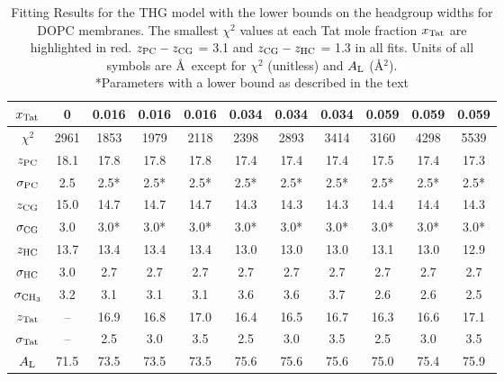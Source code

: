 \begin{table}[htbp]
  \centering
  \begin{tabular}{c|c|ccc|ccc|ccc}
  \hline 
    $x_\textrm{Tat}$ & 0  &    0.016 & 0.016 & 0.016 & 0.034 & 0.034 & 0.034 & 0.059 & 0.059 & 0.059 \\
    \hline
    $\chi^2$ & 2961 & {\color{red}1853} & 1979 & 2118 & {\color{red}2398} & 2893 & 3414    & {\color{red}3160} & 4298 & 5539 \\   
    $z_\textrm{PC}$ & 18.1   &    17.8 & 17.8 & 17.8 & 17.4 & 17.4 & 17.4    & 17.5 & 17.4 & 17.3 \\   
    $\sigma_\textrm{PC}$  & 2.5 &   2.5* &  2.5* &  2.5* & 2.5* & 2.5* & 2.5*       & 2.5* & 2.5* & 2.5* \\      
    $z_\textrm{CG}$   & 15.0 &    14.7 & 14.7 & 14.7 & 14.3 & 14.3 & 14.3    & 14.4 & 14.4 & 14.3 \\   
    $\sigma_\textrm{CG}$ & 3.0 &    3.0* &  3.0* &  3.0* & 3.0* & 3.0* & 3.0* & 3.0* & 3.0* & 3.0* \\      
    $z_\textrm{HC}$ & 13.7 &     13.4 & 13.4 & 13.4  & 13.0 & 13.0 & 13.0    & 13.1 & 13.0 & 12.9 \\   
    $\sigma_\textrm{HC}$ &      3.0 &2.7 & 2.7 & 2.7  & 2.7 & 2.7 & 2.7       & 2.7 & 2.7 & 2.7 \\      
    $\sigma_{\textrm{CH}_3}$ & 3.2 & 3.1 & 3.1 & 3.1 & 3.6 & 3.6 & 3.7       & 2.6 & 2.6 & 2.5 \\      
    $z_\textrm{Tat}$ & -- &          16.9 & 16.8 & 17.0 & 16.4 & 16.5 & 16.7    & 16.3 & 16.6 & 17.1 \\   
    $\sigma_\textrm{Tat}$ & -- &         2.5 & 3.0 & 3.5 & 2.5 & 3.0 & 3.5       & 2.5 & 3.0 & 3.5 \\      
    $A_\textrm{L}$ & 71.5 &       73.5 & 73.5 & 73.5 & 75.6 & 75.6 & 75.6    & 75.0 & 75.4 & 75.9 \\    
  \hline
  \end{tabular}
  \caption[Fitting Results for the THG model with the lower bounds on the headgroup
  widths for DOPC membranes]
  {Fitting Results for the THG model with the lower bounds on the headgroup
  widths for DOPC membranes. 
  The smallest $\chi^2$ values at each Tat mole fraction $x_\textrm{Tat}$ are highlighted in red. 
  $z_\textrm{PC}-z_\textrm{CG}$ = 3.1 and $z_\textrm{CG}-z_\textrm{HC}$ = 1.3 in all fits. 
  Units of all symbols are \AA\ except for $\chi^2$ (unitless) and $A_\textrm{L}$ (\AA$^2$).  
  \\
  *Parameters with a lower bound as described in the text}
  \label{tab:bound_DOPC}
\end{table}

